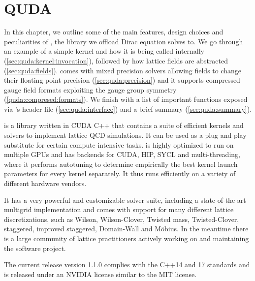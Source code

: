 \chapter{QUDA}
\label{ch:p1:quda}




In this chapter, we outline some of the main features, design choices and peculiarities of \quda, the library we offload Dirac equation solves to.
We go through an example of a simple kernel and how it is being called internally (\cref{sec:quda:kernel:invocation}), followed by how lattice fields are abstracted (\cref{sec:quda:fields}).
\Quda comes with mixed precision solvers allowing fields to change their floating point precision (\cref{sec:quda:precision}) and it supports compressed gauge field formats exploiting the gauge group symmetry (\cref{quda:compresed:formats}).
We finish with a list of important functions exposed via \quda's header file (\cref{sec:quda:interface}) and a brief summary (\cref{sec:quda:summary}).

\Quda \cite{QUDApaper} is a library written in CUDA C++ that contains a suite of efficient kernels and solvers to implement lattice QCD simulations. It can be used as a plug and play substitute for certain compute intensive tasks.
\Quda is highly optimized to run on multiple GPUs and has backends for CUDA, HIP, SYCL and multi-threading, where it performs autotuning to determine empirically the best kernel launch parameters for every kernel separately.
It thus runs efficiently on a variety of different hardware vendors.

It has a very powerful and customizable solver suite, including a state-of-the-art multigrid implementation and comes with support for many different lattice discretizations, such as Wilson, Wilson-Clover, Twisted mass, Twisted-Clover, staggered, improved staggered, Domain-Wall and Möbius. In the meantime there is a large community of lattice practitioners actively working on and maintaining the software project.

The current release version 1.1.0 complies with the C++14 and 17 standards and is released under an NVIDIA license similar to the MIT license.

